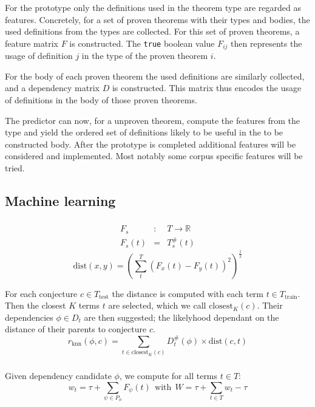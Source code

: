 For the prototype only the definitions used in the theorem type are regarded as features.
Concretely, for a set of proven theorems with their types and bodies, the used definitions from the types are collected.
For this set of proven theorems, a feature matrix $F$ is constructed.
The \texttt{true} boolean value $F_{ij}$ then represents the usage of definition $j$ in the type of the proven theorem $i$.

For the body of each proven theorem the used definitions are similarly collected, and a dependency matrix $D$ is constructed.
This matrix thus encodes the usage of definitions in the body of those proven theorems.

The predictor can now, for a unproven theorem, compute the features from the type and yield the ordered set of definitions likely to be useful in the to be constructed body.
After the prototype is completed additional features will be considered and implemented.
Most notably some corpus specific features will be tried.

\subsection{Machine learning}

\subsubsection{\knn}
$$
\begin{array}{lcl}
	F_s & : & T \rightarrow \mathbb{R} \\
	F_s(t) & = & T_s^\#(t)
\end{array}
$$
$$ \text{dist}(x, y) = \left( \sum_t^T \left( F_x(t) - F_y(t) \right)^2 \right)^{\frac{1}{2}} $$

For each conjecture $c \in T_\text{test}$ the distance is computed with each term $t \in T_\text{train}$.
Then the closest $K$ terms $t$ are selected, which we call $\text{closest}_K(c)$.
Their dependencies $\phi \in D_t$ are then suggested; the likelyhood dependant on the distance of their parents to conjecture $c$.
\[ r_\text{knn}(\phi, c) = \sum_{t \in \text{closest}_K(c)} D^\#_t(\phi) \times \text{dist}(c, t) \]

\subsubsection{\nb}

Given dependency candidate $\phi$, we compute for all terms $t \in T$:
\[
	w_t = \tau + \sum_{\psi \in P_\phi} F_\psi(t) ~~\text{with}~~ W = \tau + \sum_{t \in T} w_t - \tau
\]

